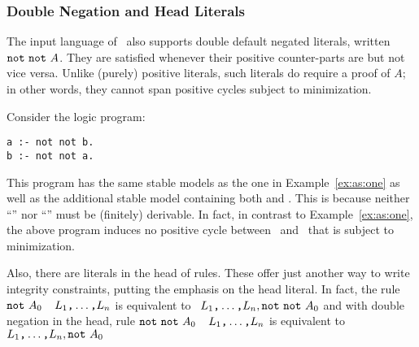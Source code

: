 \subsubsection{Double Negation and Head Literals}\label{subsec:gringo:double}

The input language of \gringo\ also supports double default negated literals,
written $\texttt{not}~\texttt{not}~A$.
They are satisfied whenever their positive counter-parts are but not vice versa. 
Unlike (purely) positive literals,
such literals do require a proof of $A$;
in other words, they cannot span positive cycles subject to minimization.
%
\begin{example}\label{ex:as:dneg}
Consider the logic program:

\begin{lstlisting}[numbers=none]
a :- not not b.
b :- not not a.
\end{lstlisting}
%
This program has the same stable models as the one in Example~\ref{ex:as:one} 
as well as the additional stable model containing both  and .
This is because neither ``'' nor ``'' must be (finitely) derivable.
In fact, in contrast to Example~\ref{ex:as:one}, 
the above program induces no positive cycle between~ and~ that is subject to minimization.
\eexample
\end{example}

Also, there are literals in the head of rules.
These offer just another way to write integrity constraints,
putting the emphasis on the head literal.
In fact, the rule
\(\texttt{not}~A_0\)~\code{:-}~\(L_1\text{\texttt{,}}\dots\text{\texttt{,}}L_n\)
is equivalent to 
\code{:-}~\(L_1\text{\texttt{,}}\dots\text{\texttt{,}}L_n,\texttt{not}~\texttt{not}~A_0\)
and with double negation in the head, rule
\(\texttt{not}~\texttt{not}~A_0\)~\code{:-}~\(L_1\text{\texttt{,}}\dots\text{\texttt{,}}L_n\)
is equivalent to 
\code{:-}~\(L_1\text{\texttt{,}}\dots\text{\texttt{,}}L_n,\texttt{not}~A_0\)

